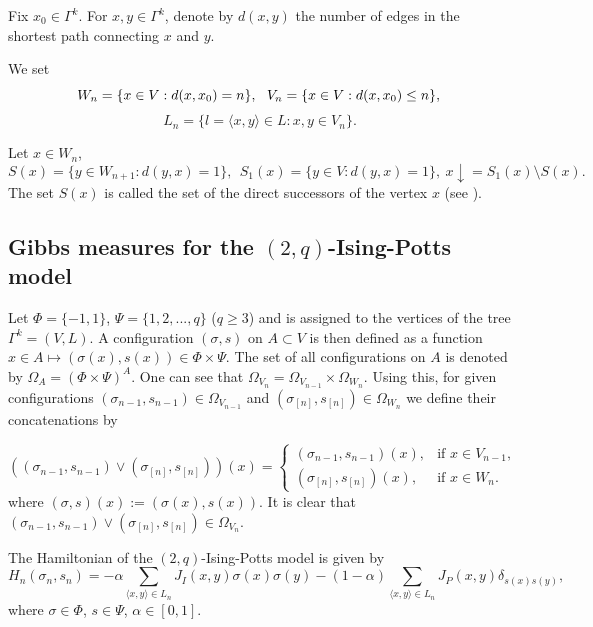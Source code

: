 \documentclass[sn-mathphys]{sn-jnl}%
\theoremstyle{thmstyleone}%
\theoremstyle{thmstyletwo}%
\theoremstyle{thmstylethree}%
\begin{document}
Fix $x_0 \in {\Gamma ^k}$. For ${x,y}\in{\Gamma^k}$, denote by $d(x,y)$ the number of edges
in the shortest path connecting $x$ and $y$.

We set
$$
W_n = \{ x \in V: d(x, x_0) = n\} ,\ \ {V_n} = \{ x \in V: d(x, x_0) \le n\},\\
$$$${L_n} = \{ l = \langle x,y \rangle  \in L: x,y \in {V_n}\}.
$$

Let $x\in W_n$,
$$S(x)=\{y \in W_{n+1}: d(y,x)=1\}, \ \ {S_1}(x) = \{ y \in
V: d(y,x) = 1\},\ x\downarrow={S_1}(x)\setminus S(x).
$$
The set $S(x)$ is called the set of the direct successors of the
vertex $x$ (see \cite{RGM}).


\subsection{Gibbs measures for the $(2,q)$-Ising-Potts model}

Let $\Phi=\{-1,1\}$, $\Psi=\{1,2,...,q\}$ ($q\geq3$) and is assigned to the vertices of the tree
$\Gamma^k=(V,L)$. A configuration $(\sigma, s)$ on $A\subset V$ is then defined as
a function $x\in A\mapsto(\sigma(x),s(x))\in\Phi\times\Psi$. The set of all configurations on $A$
 is denoted by $\Omega_A  = (\Phi\times\Psi)^A$. One can see that
$\Omega_{V_n}=\Omega_{V_{n-1}}\times\Omega_{W_n}$. Using this, for given
configurations $(\sigma_{n-1},s_{n-1})\in\Omega_{V_{n-1}}$ and $(\sigma_{[n]}, s_{[n]})\in\Omega_{W_{n}}$ we
define their concatenations  by

\begin{equation}\label{unionconf}
((\sigma_{n-1}, s_{n-1}) \vee (\sigma_{[n]}, s_{[n]}))(x) = \left\{
\begin{array}{ll}
(\sigma_{n-1}, s_{n-1})(x), & \mbox{if}\,\,x \in {V_{n - 1}},\\
(\sigma_{[n]}, s_{[n]})(x), & \mbox{if}\,\,x \in {W_n}.
\end{array} \right.
\end{equation}
where $(\sigma, s)(x):=(\sigma(x), s(x))$. It is clear that $(\sigma_{n-1}, s_{n-1}) \vee (\sigma_{[n]}, s_{[n]})\in \Omega_{V_n}$.

The Hamiltonian of the $(2,q)$-Ising-Potts model is given by
\begin{equation}\label{Ham}
H_n(\sigma_n, s_n)=-\alpha \sum_{\langle x,y\rangle \in L_n}J_{I}(x,y)\sigma(x)\sigma(y)-(1-\alpha)\sum_{\langle x,y\rangle \in L_n}J_{P}(x,y)\delta_{s(x)s(y)},
\end{equation}
where $\sigma\in\Phi$, $s\in\Psi$, $\alpha\in[0,1]$.
\end{document}
